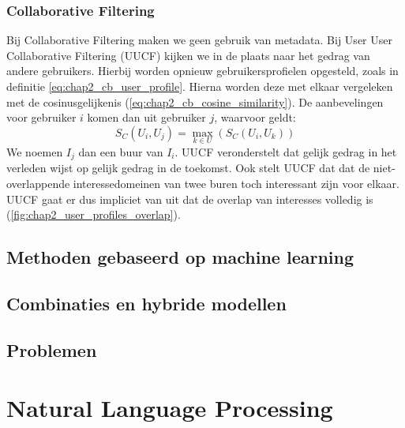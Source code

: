 \subsubsection{Collaborative Filtering}
Bij Collaborative Filtering maken we geen gebruik van metadata. Bij User User Collaborative Filtering (UUCF) kijken we in de plaats naar het gedrag van andere gebruikers. Hierbij worden opnieuw gebruikersprofielen opgesteld, zoals in definitie \ref{eq:chap2_cb_user_profile}. Hierna worden deze met elkaar vergeleken met de cosinusgelijkenis (\ref{eq:chap2_cb_cosine_similarity}). De aanbevelingen voor gebruiker $i$ komen dan uit gebruiker $j$, waarvoor geldt:
$$S_C(U_i, U_j) = \max_{k \in U}(S_C(U_i, U_k))$$
We noemen $I_j$ dan een buur van $I_i$. UUCF veronderstelt dat gelijk gedrag in het verleden wijst op gelijk gedrag in de toekomst. Ook stelt UUCF dat dat de niet-overlappende interessedomeinen van twee buren toch interessant zijn voor elkaar. UUCF gaat er dus impliciet van uit dat de overlap van interesses volledig is (\autoref{fig:chap2_user_profiles_overlap}).





\subsection{Methoden gebaseerd op machine learning}

\subsection{Combinaties en hybride modellen}

\subsection{Problemen}

\section{Natural Language Processing}

